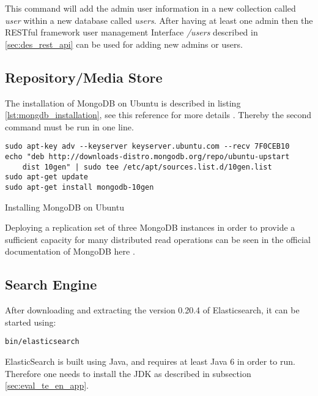 This command will add the admin user information in a new collection called \textit{user} within a new database called \textit{users}.  After having at least one admin then the RESTful framework user management Interface \textit{/users} described in \ref{sec:des_rest_api} can be used for adding new admins or users.

\subsection{Repository/Media Store\label{sec:eval_te_en_mongo}}
The installation of MongoDB on Ubuntu is described in listing \ref{lst:mongdb_installation}, see this reference for more details \cite{MongoDb:installation}. Thereby the second command must be run in one line.  
\begin{code}
\begin{verbatim}
sudo apt-key adv --keyserver keyserver.ubuntu.com --recv 7F0CEB10
echo "deb http://downloads-distro.mongodb.org/repo/ubuntu-upstart 
	dist 10gen" | sudo tee /etc/apt/sources.list.d/10gen.list
sudo apt-get update
sudo apt-get install mongodb-10gen
\end{verbatim}
\caption{Installing MongoDB on Ubuntu}
\label{lst:mongdb_installation}
\end{code}

Deploying a replication set of three MongoDB instances in order to provide a sufficient capacity for many distributed read operations can be seen in the official documentation of MongoDB here \cite{mongodb_replica_set}.

\subsection{Search Engine\label{sec:eval_te_se}}
After downloading  and extracting the version 0.20.4 of Elasticsearch, it can be started using:
\begin{code}
\begin{verbatim}
bin/elasticsearch
\end{verbatim}
\end{code}

ElasticSearch is built using Java, and requires at least Java 6 in order to run. Therefore one needs to install the \ac{JDK} as described in subsection \ref{sec:eval_te_en_app}.

